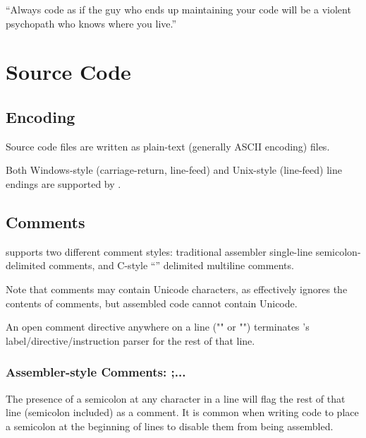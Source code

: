 \begin{savequote}
\sffamily
``Always code as if the guy who ends up maintaining your code will be a violent psychopath who knows where you live.''


\end{savequote}


\chapter{Source Code}
\label{changelog:20200908source}

\section{Encoding}

Source code files are written as plain-text (generally ASCII encoding) files.

Both Windows-style (carriage-return, line-feed) and Unix-style (line-feed) line endings are supported by \dasm.

\section{Comments}
\label{changelog:20200909comment}

\dasm supports two different comment styles: traditional assembler single-line semicolon-delimited comments, and C-style ``'' delimited multiline comments.

Note that comments may contain Unicode characters, as \dasm effectively ignores the contents of comments, but assembled code cannot contain Unicode.

An open comment directive anywhere on a line ("\mono{;}" or "\mono{/*}") terminates \dasm's label/directive/instruction parser for the rest of that line.

\subsection{Assembler-style Comments: ;...}

The presence of a semicolon at any character in a line will flag the rest of that line (semicolon included) as a comment. It is common when writing code to place a semicolon at the beginning of lines to disable them from being assembled.

